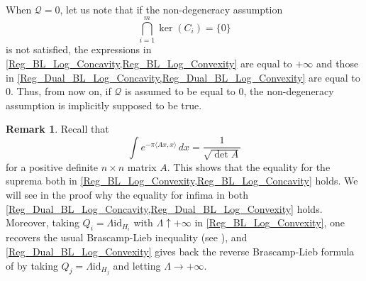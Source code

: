 \documentclass[11pt,a4paper,reqno]{amsart}
\numberwithin{equation}{section}
\theoremstyle{definition}
\newtheorem{remark}[theorem]{Remark}
\newcommand{\<}{\ensuremath \leq}
\renewcommand{\>}{\ensuremath \geq}
\begin{document}
\hfill \\

When $\mathcal{Q}=0$, let us note that if the non-degeneracy assumption $$\bigcap_{i=1}^m \ker(C_i)=\{0\}$$ is not satisfied, the expressions in \cref{Reg_BL_Log_Concavity,Reg_BL_Log_Convexity} are equal to $+\infty$ and those in \cref{Reg_Dual_BL_Log_Concavity,Reg_Dual_BL_Log_Convexity} are equal to $0.$ Thus, from now on, if $\mathcal{Q}$ is assumed to be equal to $0$, the non-degeneracy assumption is implicitly supposed to be true.

\begin{remark}
Recall that $$\int e^{-\pi \langle Ax,x\rangle}\, dx=\frac{1}{\sqrt{\det A}}$$ for a positive definite $n \times n$ matrix $A.$
This shows that the equality for the suprema both in \cref{Reg_BL_Log_Convexity,Reg_BL_Log_Concavity} holds. We will see in the proof why the equality for infima in both \cref{Reg_Dual_BL_Log_Concavity,Reg_Dual_BL_Log_Convexity} holds. 
Moreover, taking $Q_i=\Lambda \mathrm{id}_{H_i}$ with $\Lambda \uparrow +\infty$ in \cref{Reg_BL_Log_Convexity}, one recovers the usual Brascamp-Lieb inequality (see \cite[Corollary 8.16]{BCCT}), and \cref{Reg_Dual_BL_Log_Convexity} gives back the reverse Brascamp-Lieb formula of \cite{Barthe} by taking $Q_j=\Lambda \mathrm{id}_{H_j}$ and letting $\Lambda \rightarrow +\infty$. 
\end{remark}
\end{document}

